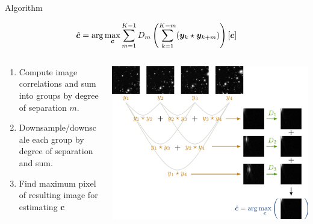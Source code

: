 \documentclass[10pt,xcolor=dvipsnames]{beamer}
\newcommand\lstar{\mkern4mu{\star}\mkern4mu}
\begin{document}
\begin{frame}{Algorithm}
  \begin{block}{}
    $$
    \hat{\bm{c}} = \arg\max_{\bm{c}} \sum_{m=1}^{K-1} D_m \left( \sum_{k=1}^{K-m} (\bm{y}_k \lstar \bm{y}_{k+m}) \right) [\bm{c}]
    $$
  \end{block}
  \begin{columns}
    \begin{column}{0.5 \textwidth}
      \begin{enumerate}
        \item {\color{BurntOrange} Compute image correlations and sum into groups by degree of separation $m$.}
        \item {\color{OliveGreen}Downsample/downscale each group by degree of separation and sum.}
        \item {\color{MidnightBlue}Find maximum pixel of resulting image for estimating $\bm{c}$}
      \end{enumerate}

    \end{column}

    \begin{column}{0.6 \textwidth}
      \includegraphics[width=\textwidth]{figures/algorithm_slow.png}
    \end{column}
  \end{columns}
\end{frame}
\end{document}
